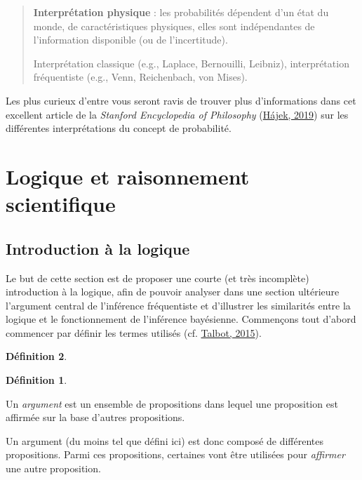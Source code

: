 \documentclass[
  a4paper,11pt,twoside,onecolumn,openright,final,oldfontcommands]{memoir}
\theoremstyle{definition}
\newtheorem{definition}{Définition}[chapter]
\theoremstyle{definition}
\theoremstyle{definition}
\theoremstyle{remark}
\begin{document}
\begin{quote}
\textbf{Interprétation physique} : les probabilités dépendent d'un état du monde, de caractéristiques physiques, elles sont indépendantes de l'information disponible (ou de l'incertitude).

Interprétation classique (e.g., Laplace, Bernouilli, Leibniz), interprétation fréquentiste (e.g., Venn, Reichenbach, von Mises).
\end{quote}

Les plus curieux d'entre vous seront ravis de trouver plus d'informations dans cet excellent article de la \emph{Stanford Encyclopedia of Philosophy} (\protect\hyperlink{ref-sep-probability-interpret}{Hájek, 2019}) sur les différentes interprétations du concept de probabilité.

\hypertarget{logique-et-raisonnement-scientifique}{%
\section{Logique et raisonnement scientifique}\label{logique-et-raisonnement-scientifique}}

\hypertarget{introduction-uxe0-la-logique}{%
\subsection{Introduction à la logique}\label{introduction-uxe0-la-logique}}

Le but de cette section est de proposer une courte (et très incomplète) introduction à la logique, afin de pouvoir analyser dans une section ultérieure l'argument central de l'inférence fréquentiste et d'illustrer les similarités entre la logique et le fonctionnement de l'inférence bayésienne. Commençons tout d'abord commencer par définir les termes utilisés (cf. \protect\hyperlink{ref-talbot_critical_2015}{Talbot, 2015}).

\begin{definition}
\begin{definition}
\protect\hypertarget{def:unlabeled-div-1}{}\label{def:unlabeled-div-1}

\protect\hypertarget{def:argument}{}{\label{def:argument} }Un \emph{argument} est un ensemble de propositions dans lequel une proposition est affirmée sur la base d'autres propositions.

\end{definition}
\end{definition}

Un argument (du moins tel que défini ici) est donc composé de différentes propositions. Parmi ces propositions, certaines vont être utilisées pour \emph{affirmer} une autre proposition.
\end{document}
